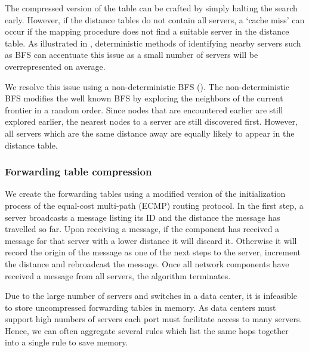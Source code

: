 The compressed version of the table can be crafted by simply halting the search early. However, if the distance tables do not contain all servers, a `cache miss' can occur if the mapping procedure does not find a suitable server in the distance table. As illustrated in , deterministic methods of identifying nearby servers such as BFS can accentuate this issue as a small number of servers will be overrepresented on average. 

We resolve this issue using a non-deterministic BFS (). The non-deterministic BFS modifies the well known BFS by exploring the neighbors of the current frontier in a random order. Since nodes that are encountered earlier are still explored earlier, the nearest nodes to a server are still discovered first. However, all servers which are the same distance away are equally likely to appear in the distance table.


\subsubsection{Forwarding table compression}
We create the forwarding tables using a modified version of the initialization process of the equal-cost multi-path (ECMP) routing protocol. In the first step, a server broadcasts a message listing its ID and the distance the message has travelled so far. Upon receiving a message, if the component has received a message for that server with a lower distance it will discard it. Otherwise it will record the origin of the message as one of the next steps to the server, increment the distance and rebroadcast the message. Once all network components have received a message from all servers, the algorithm terminates.

Due to the large number of servers and switches in a data center, it is infeasible to store uncompressed forwarding tables in memory. As data centers must support high numbers of servers each port must facilitate access to many servers. Hence, we can often aggregate several rules which list the same hops together into a single rule to save memory. 

